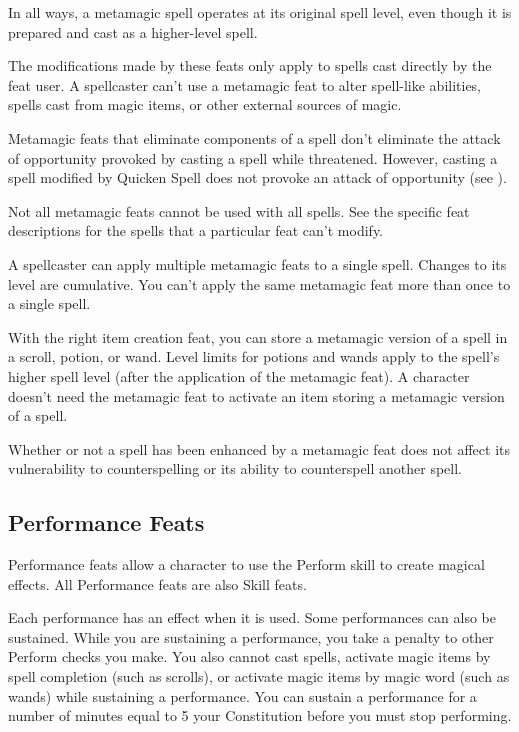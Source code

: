  In all ways, a metamagic spell operates at its original spell level, even though it is prepared and cast as a higher-level spell.

The modifications made by these feats only apply to spells cast directly by the feat user. A spellcaster can't use a metamagic feat to alter spell-like abilities, spells cast from magic items, or other external sources of magic.

Metamagic feats that eliminate components of a spell don't eliminate the attack of opportunity provoked by casting a spell while threatened. However, casting a spell modified by Quicken Spell does not provoke an attack of opportunity (see ).

Not all metamagic feats cannot be used with all spells. See the specific feat descriptions for the spells that a particular feat can't modify.

 A spellcaster can apply multiple metamagic feats to a single spell. Changes to its level are cumulative. You can't apply the same metamagic feat more than once to a single spell.

 With the right item creation feat, you can store a metamagic version of a spell in a scroll, potion, or wand. Level limits for potions and wands apply to the spell's higher spell level (after the application of the metamagic feat). A character doesn't need the metamagic feat to activate an item storing a metamagic version of a spell.

 Whether or not a spell has been enhanced by a metamagic feat does not affect its vulnerability to counterspelling or its ability to counterspell another spell.

\subsection{Performance Feats}
Performance feats allow a character to use the Perform skill to create magical effects. All Performance feats are also Skill feats.

Each performance has an effect when it is used. Some performances can also be sustained. While you are sustaining a performance, you take a  penalty to other Perform checks you make. You also cannot cast spells, activate magic items by spell completion (such as scrolls), or activate magic items by magic word (such as wands) while sustaining a performance. You can sustain a performance for a number of minutes equal to 5 \add your Constitution before you must stop performing.

